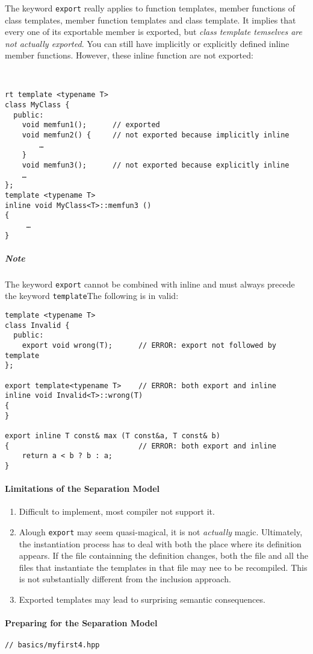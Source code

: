\documentclass[11pt, a4paper]{book}
\begin{document}
\begin{itemize}
The keyword \verb|export| really applies to function templates, member functions of class templates, member function templates and class template. It implies that every one of its exportable member is exported, but \emph{class template temselves are not actually exported}. You can still have implicitly or explicitly defined inline member functions. However, these inline function are not exported:
\begin{verbatim}


rt template <typename T> 
class MyClass { 
  public: 
    void memfun1();      // exported 
    void memfun2() {     // not exported because implicitly inline 
        … 
    } 
    void memfun3();      // not exported because explicitly inline 
    … 
}; 
template <typename T> 
inline void MyClass<T>::memfun3 () 
{ 
     … 
} 
\end{verbatim}
\subparagraph{Note} The keyword \verb|export| cannot be combined with inline and must always precede the keyword \verb|template|The following is in valid:
\begin{verbatim}
template <typename T> 
class Invalid { 
  public: 
    export void wrong(T);      // ERROR: export not followed by template 
}; 

export template<typename T>    // ERROR: both export and inline 
inline void Invalid<T>::wrong(T) 
{ 
} 

export inline T const& max (T const&a, T const& b) 
{                              // ERROR: both export and inline 
    return a < b ? b : a; 
} 
\end{verbatim}
\paragraph{Limitations of the Separation Model}
\begin{enumerate}
\item Difficult to implement, most compiler not support it.
\item Alough \verb|export| may seem quasi-magical, it is not \emph{actually} magic. Ultimately, the instantiation process has to deal with both the place where its definition appears. If the file containning the definition changes, both the file and all the files that instantiate the templates in that file may nee to be recompiled. This is not substantially different from the inclusion approach.
\item Exported templates may lead to surprising semantic consequences.
\end{enumerate}
\paragraph{Preparing for the Separation Model}
\begin{verbatim}
// basics/myfirst4.hpp 


\end{verbatim}
\end{itemize}
\end{document}
